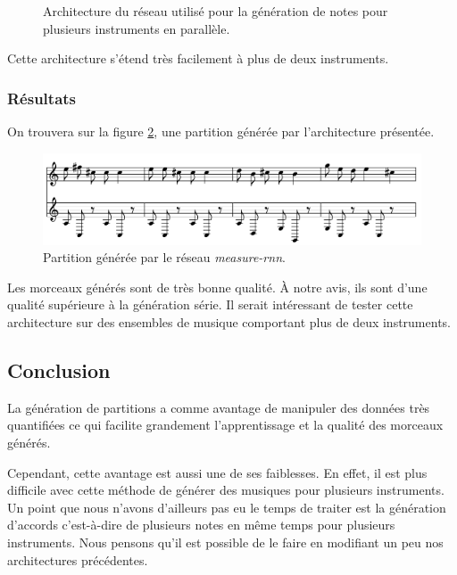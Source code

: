 \begin{figure}[h!]
\begin{center}

\caption{Architecture du réseau utilisé pour la génération de notes pour plusieurs instruments en parallèle.}
\label{measure_rnn}
\end{center}
\end{figure}

Cette architecture s'étend très facilement à plus de deux instruments.

\subsubsection{Résultats}

On trouvera sur la figure \ref{result_measure_rnn}, une partition générée par l'architecture présentée.

\begin{figure}[h!]
\begin{center}
\includegraphics[scale=0.3]{images/chapter9/measure_rnn_result.png}
\caption{Partition générée par le réseau \textit{measure-rnn}.}
\label{result_measure_rnn}
\end{center}
\end{figure}

Les morceaux générés sont de très bonne qualité. À notre avis, ils sont d'une qualité supérieure à la génération série. Il serait intéressant de tester cette architecture sur des ensembles de musique comportant plus de deux instruments.

\subsection{Conclusion}

La génération de partitions a comme avantage de manipuler des données très quantifiées ce qui facilite grandement l'apprentissage et la qualité des morceaux générés.

Cependant, cette avantage est aussi une de ses faiblesses. En effet, il est plus difficile avec cette méthode de générer des musiques pour plusieurs instruments. Un point que nous n'avons d'ailleurs pas eu le temps de traiter est la génération d'accords c'est-à-dire de plusieurs notes en même temps pour plusieurs instruments. Nous pensons qu'il est possible de le faire en modifiant un peu nos architectures précédentes.

